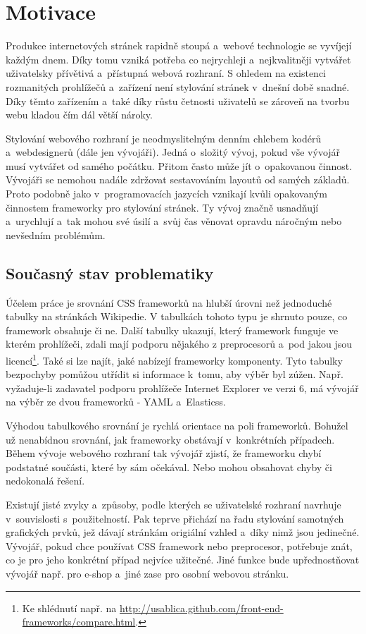 \documentclass[thesis=B,czech]{FITthesis}[2012/06/26]
\begin{document}
\chapter{Motivace}
Produkce internetových stránek rapidně stoupá a~webové technologie se vyvíjejí každým dnem. Díky tomu vzniká potřeba co nejrychleji a~nejkvalitněji vytvářet uživatelsky přívětivá a~přístupná webová rozhraní. S ohledem na existenci rozmanitých prohlížečů a~zařízení není stylování stránek v~dnešní době snadné. Díky těmto zařízením a~také díky růstu četnosti uživatelů se zároveň na tvorbu webu kladou čím dál větší nároky.

Stylování webového rozhraní je neodmyslitelným denním chlebem kodérů a~webdesignerů (dále jen vývojáři). Jedná o~složitý vývoj, pokud vše vývojář musí vytvářet od samého počátku. Přitom často může jít o~opakovanou činnost. Vývojáři se nemohou nadále zdržovat sestavováním layoutů od samých základů. Proto podobně jako v~programovacích jazycích vznikají kvůli opakovaným činnostem frameworky pro stylování stránek. Ty vývoj značně usnadňují a~urychlují a~tak mohou své úsilí a~svůj čas věnovat opravdu náročným nebo nevšedním problémům.


\section{Současný stav problematiky}

Účelem práce je srovnání CSS frameworků na hlubší úrovni než jednoduché tabulky na stránkách Wikipedie. V tabulkách tohoto typu je shrnuto pouze, co framework obsahuje či ne. Další tabulky ukazují, který framework funguje ve kterém prohlížeči, zdali mají podporu nějakého z preprocesorů a~pod jakou jsou licencí\footnote{Ke shlédnutí např. na \url{http://usablica.github.com/front-end-frameworks/compare.html}.}. Také si lze najít, jaké nabízejí frameworky komponenty. Tyto tabulky bezpochyby pomůžou utřídit si informace k~tomu, aby výběr byl zúžen. Např. vyžaduje-li zadavatel podporu prohlížeče Internet Explorer ve verzi 6, má vývojář na výběr ze dvou frameworků - YAML a~Elasticss.

Výhodou tabulkového srovnání je rychlá orientace na poli frameworků. Bohužel už nenabídnou srovnání, jak frameworky obstávají v~konkrétních případech. Během vývoje webového rozhraní tak vývojář zjistí, že frameworku chybí podstatné součásti, které by sám očekával. Nebo mohou obsahovat chyby či nedokonalá řešení. 

Existují jisté zvyky a~způsoby, podle kterých se uživatelské rozhraní navrhuje v~souvislosti s~použitelností. Pak teprve přichází na řadu stylování samotných grafických prvků, jež dávají stránkám origiální vzhled a~díky nimž jsou jedinečné. Vývojář, pokud chce používat CSS framework nebo preprocesor, potřebuje znát, co je pro jeho konkrétní případ nejvíce užitečné. Jiné funkce bude upřednostňovat vývojář např. pro e-shop a~jiné zase pro osobní webovou stránku.
\end{document}
